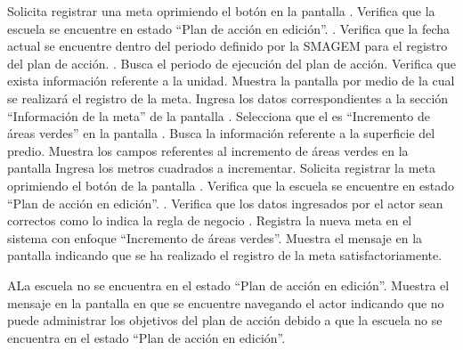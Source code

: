 \begin{UCtrayectoria}
	\UCpaso[\UCactor] Solicita registrar una meta oprimiendo el botón  en la pantalla .
	\UCpaso[\UCsist] Verifica que la escuela se encuentre en  estado ``Plan de acción en edición''. .
    \UCpaso[\UCsist] Verifica que la fecha actual se encuentre dentro del periodo definido por la SMAGEM para el registro del plan de acción. .	
	\UCpaso[\UCsist] Busca el periodo de ejecución del plan de acción.
	\UCpaso[\UCsist] Verifica que exista información referente a la unidad. 
	\UCpaso[\UCsist] Muestra la pantalla  por medio de la cual se realizará el registro de la meta.
	\UCpaso[\UCactor] Ingresa los datos correspondientes a la sección ``Información de la meta'' de la pantalla . \label{cupb1:ingresaDatos}
	\UCpaso[\UCactor] Selecciona que el  es ``Incremento de áreas verdes'' en la pantalla . 
	\UCpaso[\UCsist] Busca la información referente a la superficie del predio.
	\UCpaso[\UCsist] Muestra los campos referentes al incremento de áreas verdes en la pantalla 
	\UCpaso[\UCactor] Ingresa los metros cuadrados a incrementar.
	\UCpaso[\UCactor] Solicita registrar la meta oprimiendo el botón  de la pantalla . 
	\UCpaso[\UCsist] Verifica que la escuela se encuentre en  estado ``Plan de acción en edición''. .	
	\UCpaso[\UCsist] Verifica que los datos ingresados por el actor sean correctos como lo indica la regla de negocio .   
	\UCpaso[\UCsist] Registra la nueva meta en el sistema con enfoque ``Incremento de áreas verdes''.
	\UCpaso[\UCsist] Muestra el mensaje  en la pantalla  indicando que se ha realizado el registro de la meta satisfactoriamente. \label{cupb1:muestraMensaje}
\end{UCtrayectoria}

\begin{UCtrayectoriaA}{A}{La escuela no se encuentra en el estado ``Plan de acción en edición''.}
    \UCpaso[\UCsist] Muestra el mensaje  en la pantalla en que se encuentre navegando el actor indicando que no puede administrar los objetivos del plan de acción debido a que la escuela no se encuentra en el estado ``Plan de acción en edición''. 
 \end{UCtrayectoriaA}
 
